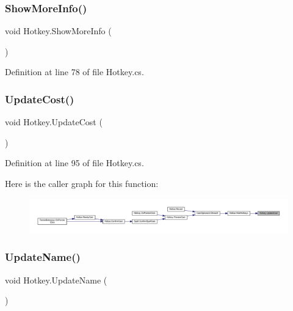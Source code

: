 \subsubsection{\texorpdfstring{ShowMoreInfo()}{ShowMoreInfo()}}
{\footnotesize\ttfamily void Hotkey.\+Show\+More\+Info (\begin{DoxyParamCaption}{ }\end{DoxyParamCaption})}



Definition at line 78 of file Hotkey.\+cs.

\mbox{\label{class_hotkey_a15822d970e7f05f8ea8ef4069a4e245a}} 
\subsubsection{\texorpdfstring{UpdateCost()}{UpdateCost()}}
{\footnotesize\ttfamily void Hotkey.\+Update\+Cost (\begin{DoxyParamCaption}{ }\end{DoxyParamCaption})}



Definition at line 95 of file Hotkey.\+cs.

Here is the caller graph for this function\+:
\nopagebreak
\begin{figure}[H]
\begin{center}
\leavevmode
\includegraphics[width=350pt]{class_hotkey_a15822d970e7f05f8ea8ef4069a4e245a_icgraph}
\end{center}
\end{figure}
\mbox{\label{class_hotkey_a414aefec4d51bfa4b6fc68fcb8dce841}} 
\subsubsection{\texorpdfstring{UpdateName()}{UpdateName()}}
{\footnotesize\ttfamily void Hotkey.\+Update\+Name (\begin{DoxyParamCaption}{ }\end{DoxyParamCaption})}



